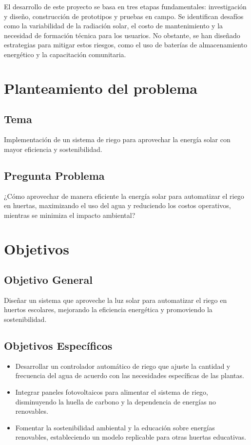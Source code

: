 \documentclass[12pt]{article}
\begin{document}
El desarrollo de este proyecto se basa en tres etapas fundamentales: investigación y diseño, construcción de prototipos y pruebas en campo. Se identifican desafíos como la variabilidad de la radiación solar, el costo de mantenimiento y la necesidad de formación técnica para los usuarios. No obstante, se han diseñado estrategias para mitigar estos riesgos, como el uso de baterías de almacenamiento energético y la capacitación comunitaria.
\newpage
\section{Planteamiento del problema}
\subsection{Tema}
Implementación de un sistema de riego para aprovechar la energía solar con mayor eficiencia y sostenibilidad.

\subsection{Pregunta Problema}
¿Cómo aprovechar de manera eficiente la energía solar para automatizar el riego en huertas, maximizando el uso del agua y reduciendo los costos operativos, mientras se minimiza el impacto ambiental?
\newpage
\section{Objetivos}
\subsection{Objetivo General}
Diseñar un sistema que aproveche la luz solar para automatizar el riego en huertos escolares, mejorando la eficiencia energética y promoviendo la sostenibilidad.


\subsection{Objetivos Específicos}
\begin{itemize}
      \item Desarrollar un controlador automático de riego que ajuste la cantidad y frecuencia del agua de acuerdo con las necesidades específicas de las plantas.
      \item Integrar paneles fotovoltaicos para alimentar el sistema de riego, disminuyendo la huella de carbono y la dependencia de energías no renovables.
      \item Fomentar la sostenibilidad ambiental y la educación sobre energías renovables, estableciendo un modelo replicable para otras huertas educativas.
\end{itemize}
\newpage
\end{document}

